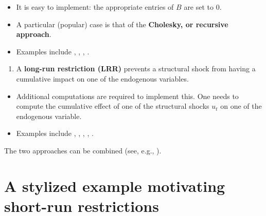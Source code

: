 \documentclass[
  12pt,
]{book}
\providecommand{\tightlist}{%
  \setlength{\itemsep}{0pt}\setlength{\parskip}{0pt}}
\theoremstyle{definition}
\theoremstyle{definition}
\theoremstyle{definition}
\theoremstyle{definition}
\theoremstyle{remark}
\begin{document}
\begin{itemize}
\tightlist
\item
  It is easy to implement: the appropriate entries of \(B\) are set to 0.
\item
  A particular (popular) case is that of the \textbf{Cholesky, or recursive approach}.
\item
  Examples include \citet{BERNANKE198649}, \citet{Sims_1986}, \citet{Gali_1992}, \citet{RubioRamirez_et_al_2010}.
\end{itemize}

\begin{enumerate}
\def\labelenumi{\arabic{enumi}.}
\setcounter{enumi}{1}
\tightlist
\item
  A \textbf{long-run restriction (LRR)} prevents a structural shock from having a cumulative impact on one of the endogenous variables.
\end{enumerate}

\begin{itemize}
\tightlist
\item
  Additional computations are required to implement this. One needs to compute the cumulative effect of one of the structural shocks \(u_{t}\) on one of the endogenous variable.
\item
  Examples include \citet{Blanchard_Quah_1989}, \citet{Faust_Leeper_1997}, \citet{Gali_1999}, \citet{Erceg_et_al_2005}, \citet{NBERc11177}.
\end{itemize}

The two approaches can be combined (see, e.g., \citet{Gerlach_Smets_1995}).

\hypertarget{a-stylized-example-motivating-short-run-restrictions}{%
\section{A stylized example motivating short-run restrictions}\label{a-stylized-example-motivating-short-run-restrictions}}
\end{document}
